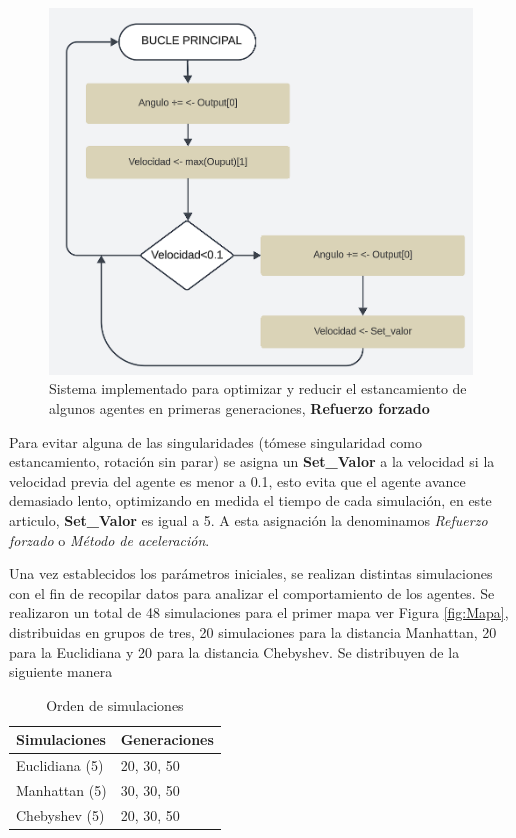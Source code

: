 \documentclass[conference]{IEEEtran}
\begin{document}
\begin{figure}
    \centering
    \includegraphics[width=0.7\linewidth]{images/reforce.png}
    \caption{Sistema implementado para optimizar y reducir el estancamiento de algunos agentes en primeras generaciones, \textbf{Refuerzo forzado}}
    \label{fig:reforce}
\end{figure}

Para evitar alguna de las singularidades (tómese singularidad como estancamiento, rotación sin parar) se asigna un \textbf{Set\_Valor} a la velocidad si la velocidad previa del agente es menor a 0.1, esto evita que el agente avance demasiado lento, optimizando en medida el tiempo de cada simulación, en este articulo, \textbf{Set\_Valor} es igual a 5. A esta asignación la denominamos \textit{Refuerzo forzado} o \textit{Método de aceleración}.


Una vez establecidos los parámetros iniciales, se realizan distintas simulaciones con el fin de recopilar datos para analizar el comportamiento de los agentes. Se realizaron un total de 48 simulaciones para el primer mapa ver Figura \ref{fig:Mapa}, distribuidas en grupos de tres, 20 simulaciones para la distancia Manhattan, 20 para la Euclidiana y 20 para la distancia Chebyshev. Se distribuyen de la siguiente manera

\begin{table}[H]
\centering
\caption{Orden de simulaciones}
\label{tab:fds}
\begin{tabular}{ll}
\toprule
\textbf{Simulaciones} & \textbf{Generaciones} \\
\midrule
Euclidiana (5)   &  20, 30, 50 \\
Manhattan (5)    & 30, 30, 50 \\
Chebyshev (5)    & 20, 30, 50 \\
\bottomrule
\end{tabular}
\end{table}
\end{document}
